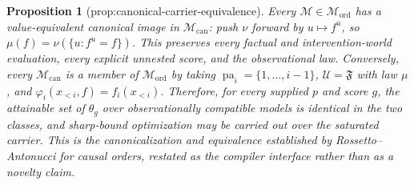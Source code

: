 \documentclass{article}
\newtheorem{proposition}{Proposition}
\begin{document}
\begin{proposition}[prop:canonical-carrier-equivalence]\label{prop:canonical-carrier-equivalence}
Every \(\mathcal M\in\mathcal M_{\mathrm{ord}}\) has a value-equivalent canonical image in \(\mathcal M_{\mathrm{can}}\): push \(\nu\) forward by \(u\mapsto f^u\), so \(\mu(f)=\nu(\{u:f^u=f\})\). This preserves every factual and intervention-world evaluation, every explicit unnested score, and the observational law. Conversely, every \(\mathcal M_{\mathrm{can}}\) is a member of \(\mathcal M_{\mathrm{ord}}\) by taking \(\operatorname{pa}_i=\{1,\ldots,i-1\}\), \(\mathcal U=\mathfrak F\) with law \(\mu\), and \(\varphi_i(x_{<i},f)=f_i(x_{<i})\). Therefore, for every supplied \(p\) and score \(g\), the attainable set of \(\theta_g\) over observationally compatible models is identical in the two classes, and sharp-bound optimization may be carried out over the saturated carrier. This is the canonicalization and equivalence established by Rossetto--Antonucci for causal orders, restated as the compiler interface rather than as a novelty claim.
\end{proposition}
\end{document}
